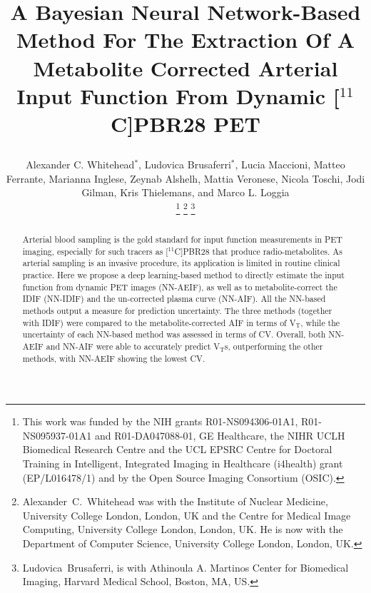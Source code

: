 \documentclass{IEEEtran}
\begin{document}
\title{
    \vspace{-0.75cm}
    
    A Bayesian Neural Network-Based Method For The Extraction Of A Metabolite Corrected Arterial Input Function From Dynamic [$^{11}$C]PBR28 PET 
}

\author{
    \vspace{-0.25cm}
    
    Alexander C. Whitehead$^{*}$,
    Ludovica Brusaferri$^{*}$,
    Lucia Maccioni,
    Matteo Ferrante,
    Marianna Inglese,
    Zeynab Alshelh,
    Mattia Veronese,
    Nicola Toschi,
    Jodi Gilman,
    Kris Thielemans, and
    Marco L. Loggia

    \vspace{-0.75cm}
    
    \thanks{This work was funded by the NIH grants R01-NS094306-01A1, R01-NS095937-01A1 and R01-DA047088-01, GE Healthcare, the NIHR UCLH Biomedical Research Centre and the UCL EPSRC Centre for Doctoral Training in Intelligent, Integrated Imaging in Healthcare (i4health) grant (EP/L016478/1) and by the Open Source Imaging Consortium (OSIC).}
    \thanks{Alexander~C.~Whitehead was with the Institute of Nuclear Medicine, University College London, London, UK and the Centre for Medical Image Computing, University College London, London, UK. He is now with the Department of Computer Science, University College London, London, UK.} 
    \thanks{Ludovica~Brusaferri, is with Athinoula A. Martinos Center for Biomedical Imaging, Harvard Medical School, Boston, MA, US.}
}

\pagestyle{plain}

\maketitle

\begin{abstract}
    Arterial blood sampling is the gold standard for input function measurements in PET imaging, especially for such tracers as [$^{11}$C]PBR28 that produce radio-metabolites. As arterial sampling is an invasive procedure, its application is limited in routine clinical practice. Here we propose a deep learning-based method to directly estimate the input function from dynamic PET images (NN-AEIF), as well as to metabolite-correct the IDIF (NN-IDIF) and the un-corrected  plasma curve (NN-AIF). All the NN-based methods output a measure for prediction uncertainty. The three methods (together with IDIF) were compared to the metabolite-corrected AIF in terms of V{$_\mathrm{T}$}, while the uncertainty of each NN-based method was assessed in terms of CV. Overall, both NN-AEIF and NN-AIF were able to accurately predict V{$_\mathrm{T}$}s, outperforming the other methods, with NN-AEIF showing the lowest  CV.
\end{abstract}







\vspace{-0.5cm}

\AtNextBibliography{\scriptsize}
\printbibliography
\end{document}
